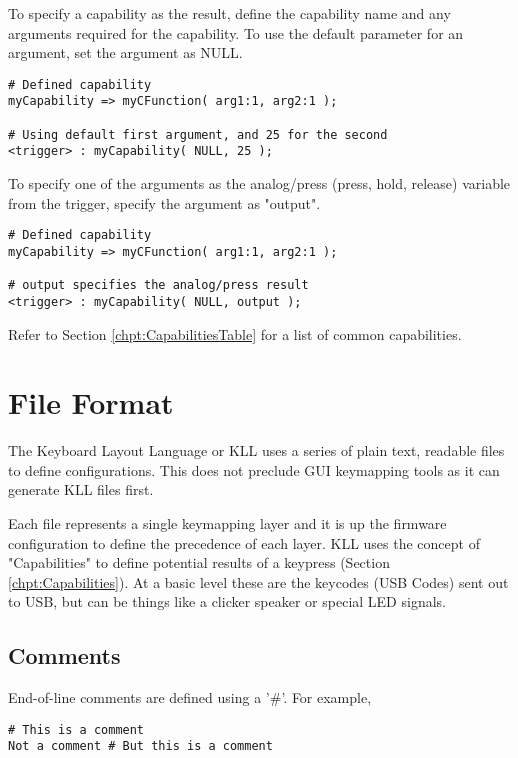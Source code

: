 \documentclass{kiibohd-template}
\begin{document}
To specify a capability as the result, define the capability name and any arguments required for the capability.
To use the default parameter for an argument, set the argument as NULL.

\begin{lstlisting}
# Defined capability
myCapability => myCFunction( arg1:1, arg2:1 );

# Using default first argument, and 25 for the second
<trigger> : myCapability( NULL, 25 );
\end{lstlisting}

To specify one of the arguments as the analog/press (press, hold, release) variable from the trigger, specify the argument as "output".

\begin{lstlisting}
# Defined capability
myCapability => myCFunction( arg1:1, arg2:1 );

# output specifies the analog/press result
<trigger> : myCapability( NULL, output );
\end{lstlisting}

Refer to Section \ref{chpt:CapabilitiesTable} for a list of common capabilities.


\chapter{File Format}

The Keyboard Layout Language or KLL uses a series of plain text, readable files to define configurations.
This does not preclude GUI keymapping tools as it can generate KLL files first.

Each file represents a single keymapping layer and it is up the firmware configuration to define the precedence of each layer.
KLL uses the concept of "Capabilities" to define potential results of a keypress (Section \ref{chpt:Capabilities}).
At a basic level these are the keycodes (USB Codes) sent out to USB, but can be things like a clicker speaker or special LED signals.


\section{Comments}

End-of-line comments are defined using a '\#'.
For example,

\begin{lstlisting}
# This is a comment
Not a comment # But this is a comment
\end{lstlisting}
\end{document}
